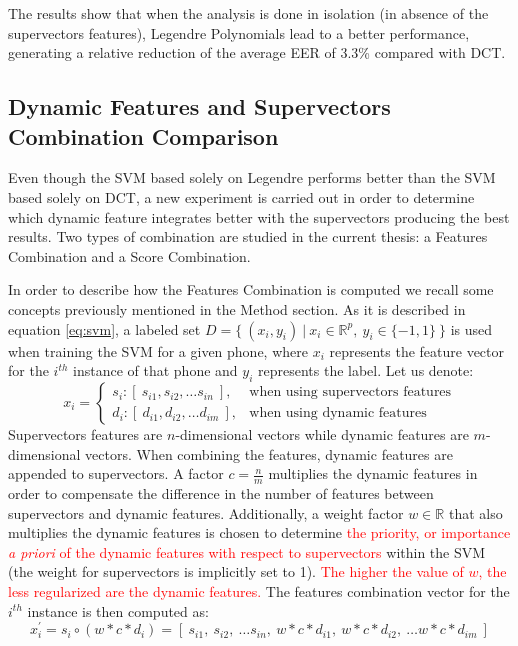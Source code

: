The results show that when the analysis is done in isolation (in absence of the supervectors
features), Legendre Polynomials lead to a better performance, generating a relative reduction
of the average EER of 3.3\% compared with DCT.

\subsection{Dynamic Features and Supervectors Combination Comparison}

Even though the SVM based solely on Legendre performs better than the SVM based solely on
DCT, a new experiment is carried out in order to determine which
dynamic feature integrates better
with the supervectors producing the best results. Two types of combination are
studied in the current thesis: a Features Combination and a Score
Combination.

In order to describe how the Features Combination is computed we recall some
concepts previously mentioned in the Method section.
As it is described in equation \ref{eq:svm}, a labeled set
\mbox{$D=\{ \ (x_{i}, y_{i}) \ | \ x_{i} \in \mathbb{R}^{p}, \ y_{i} \in \{-1, 1\} \ \}$}
is used
when training the SVM for a given phone, where $x_{i}$ represents the feature vector for the
$i^{th}$ instance of that phone and $y_{i}$ represents the label.
Let us denote:
\begin{equation}
	x_{i} =
	\begin{cases}
		s_{i} : [ \ s_{i1}, s_{i2}, \dotsc s_{in} \ ], & \text{when using supervectors features} \\
		d_{i} : [ \ d_{i1}, d_{i2}, \dotsc d_{im} \ ], & \text{when using dynamic features}
	\end{cases}
\end{equation}
Supervectors features are $n$-dimensional vectors while dynamic features are $m$-dimensional
vectors. When combining the features, dynamic features are appended to supervectors.
A factor $c = \frac{n}{m}$ multiplies the dynamic features
in order to compensate the difference in
the number of features between supervectors and dynamic features.
Additionally, a weight factor $w \in \mathbb{R}$ that also multiplies the dynamic features
is chosen to determine
\textcolor{red}{
the priority, or importance \textit{a priori} of the dynamic features with respect to supervectors}
within the SVM (the weight for supervectors is implicitly set to 1).
\textcolor{red}{The higher the value of $w$, the less regularized are the dynamic features.}
The features combination vector for the $i^{th}$ instance is then computed as:
\begin{equation}
	x_{i}^{\prime} = s_{i} \circ (w * c * d_{i}) = [ \ s_{i1}, \ s_{i2}, \ \dotsc s_{in}, \ w * c * d_{i1}, \ w * c * d_{i2}, \ \dotsc w * c * d_{im} \ ]
	\label{eq:featuresCombination}
\end{equation}

